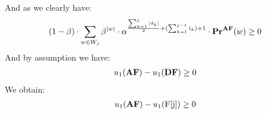 And as we clearly have:
\begin{eqnarray*}
(1-\beta)\cdot\sum_{w \in W_j}  \beta^{|w|}\cdot \alpha^{\frac{\sum_{k=1}^{j} |d_k|}{2}+(\sum_{k=1}^{j-1} i_k) +1} \cdot \mathbf{Pr}^{\text{\rm {\bf AF}}}(w) \geq 0
\end{eqnarray*}
And by assumption we have:
\begin{eqnarray*}
u_1(\text{\rm {\bf AF}}) - u_1(\text{\rm {\bf DF}}) \geq 0
\end{eqnarray*}
We obtain:
\begin{eqnarray*}
u_1(\text{\rm {\bf AF}}) - u_1(\text{\rm F[{j}]}) \geq 0
\end{eqnarray*}
 




